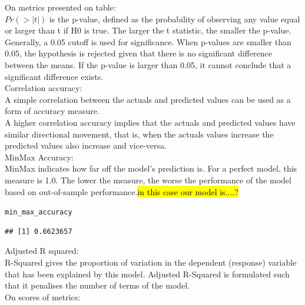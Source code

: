 \documentclass[10pt]{article}\usepackage[]{graphicx}\usepackage[]{color}
\makeatletter
\newcommand{\hlstd}[1]{\textcolor[rgb]{0.345,0.345,0.345}{#1}}%
\newenvironment{kframe}{%
 \def\at@end@of@kframe{}%
 \ifinner\ifhmode%
  \def\at@end@of@kframe{\end{minipage}}%
  \begin{minipage}{\columnwidth}%
 \fi\fi%
 \def\FrameCommand##1{\hskip\@totalleftmargin \hskip-\fboxsep
 \colorbox{shadecolor}{##1}\hskip-\fboxsep
     \hskip-\linewidth \hskip-\@totalleftmargin \hskip\columnwidth}%
 \MakeFramed {\advance\hsize-\width
   \@totalleftmargin\z@ \linewidth\hsize
   \@setminipage}}%
 {\par\unskip\endMakeFramed%
 \at@end@of@kframe}
\newenvironment{knitrout}{}{} %
\makeatother
\begin{document}
On metrics presented on table:\\

$Pr(>|t|)$ is the p-value, defined as the probability of observing any value equal or larger than t if H0 is true. The larger the t statistic, the smaller the p-value. Generally, a 0.05 cutoff is used for significance. When p-values are smaller than 0.05, the hypothesis is rejected given that there is no significant difference between the means. If the p-value is larger than 0.05, it cannot conclude that a significant difference exists.\\

Correlation accuracy:\\
A simple correlation between the actuals and predicted values can be used as a form of accuracy measure.\\
A higher correlation accuracy implies that the actuals and predicted values have similar directional movement, that is, when the actuals values increase the predicted values also increase and vice-versa.\\

MinMax Accuracy:\\
MinMax indicates how far off the model's prediction is. For a perfect model, this measure is 1.0. The lower the measure, the worse the performance of the model based on out-of-sample performance.\hl{in this case our model is....?}\\


\begin{knitrout}\small
{}\color{fgcolor}\begin{kframe}
\begin{alltt}
\hlstd{min_max_accuracy}
\end{alltt}
\begin{verbatim}
## [1] 0.6623657
\end{verbatim}
\end{kframe}
\end{knitrout}

Adjusted R squared:\\
R-Squared gives the proportion of variation in the dependent (response) variable that has been explained by this model. Adjusted R-Squared is formulated such that it penalises the number of terms of the model.\\


On scores of metrics:\\
\end{document}
